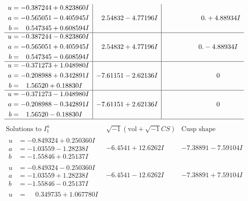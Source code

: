 \documentclass[1p]{elsarticle_modified}
\theoremstyle{definition}
\newcommand{\I}{\sqrt{-1}}
\begin{document}
$$\begin{array}{c|c|c}
\begin{aligned}
u &= -0.387244 + 0.823860 I \\
a &= -0.565051 - 0.405945 I \\
b &= \phantom{-}0.547345 + 0.608594 I\end{aligned}
 & \phantom{-}2.54832 - 4.77196 I & \phantom{-0.000000 -}0. + 4.88934 I \\ \hline\begin{aligned}
u &= -0.387244 - 0.823860 I \\
a &= -0.565051 + 0.405945 I \\
b &= \phantom{-}0.547345 - 0.608594 I\end{aligned}
 & \phantom{-}2.54832 + 4.77196 I & \phantom{-0.000000 } 0. - 4.88934 I \\ \hline\begin{aligned}
u &= -0.371273 + 1.048980 I \\
a &= -0.208988 + 0.342891 I \\
b &= \phantom{-}1.56520 + 0.18830 I\end{aligned}
 & -7.61151 - 2.62136 I & \phantom{-0.000000 } 0 \\ \hline\begin{aligned}
u &= -0.371273 - 1.048980 I \\
a &= -0.208988 - 0.342891 I \\
b &= \phantom{-}1.56520 - 0.18830 I\end{aligned}
 & -7.61151 + 2.62136 I & \phantom{-0.000000 } 0\\
 \hline 
 \end{array}$$\newpage$$\begin{array}{c|c|c}  
\text{Solutions to }I^u_{1}& \I (\text{vol} + \sqrt{-1}CS) & \text{Cusp shape}\\
 \hline 
\begin{aligned}
u &= -0.849324 + 0.250360 I \\
a &= -1.03559 - 1.28238 I \\
b &= -1.55846 + 0.25137 I\end{aligned}
 & -6.4541 + 12.6262 I & -7.38891 - 7.59104 I \\ \hline\begin{aligned}
u &= -0.849324 - 0.250360 I \\
a &= -1.03559 + 1.28238 I \\
b &= -1.55846 - 0.25137 I\end{aligned}
 & -6.4541 - 12.6262 I & -7.38891 + 7.59104 I \\ \hline\begin{aligned}
u &= \phantom{-}0.349735 + 1.067780 I \\

\end{aligned}
\end{array}$$
\end{document}
